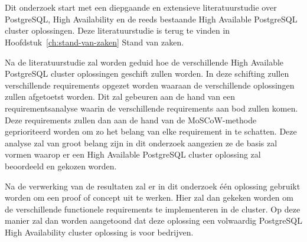 
\chapter{}
\label{ch:methodologie}


Dit onderzoek start met een diepgaande en extensieve literatuurstudie over PostgreSQL, High Availability en de reeds bestaande High Available PostgreSQL cluster oplossingen. Deze literatuurstudie is terug te vinden in Hoofdstuk~\ref{ch:stand-van-zaken} Stand van zaken.

Na de literatuurstudie zal worden geduid hoe de verschillende High Available PostgreSQL cluster oplossingen geschift zullen worden. In deze schifting zullen verschillende requirements opgezet worden waaraan de verschillende oplossingen zullen afgetoetst worden. Dit zal gebeuren aan de hand van een requirementsanalyse waarin de verschillende requirements aan bod zullen komen. Deze requirements zullen dan aan de hand van de MoSCoW-methode geprioriteerd worden om zo het belang van elke requirement in te schatten. Deze analyse zal van groot belang zijn in dit onderzoek aangezien ze de basis zal vormen waarop er een High Available PostgreSQL cluster oplossing zal beoordeeld en gekozen worden.

Na de verwerking van de resultaten zal er in dit onderzoek één oplossing gebruikt worden om een proof of concept uit te werken. Hier zal dan gekeken worden om de verschillende functionele requirements te implementeren in de cluster. Op deze manier zal dan worden aangetoond dat deze oplossing een volwaardig PostgreSQL High Availability cluster oplossing is voor bedrijven.%

